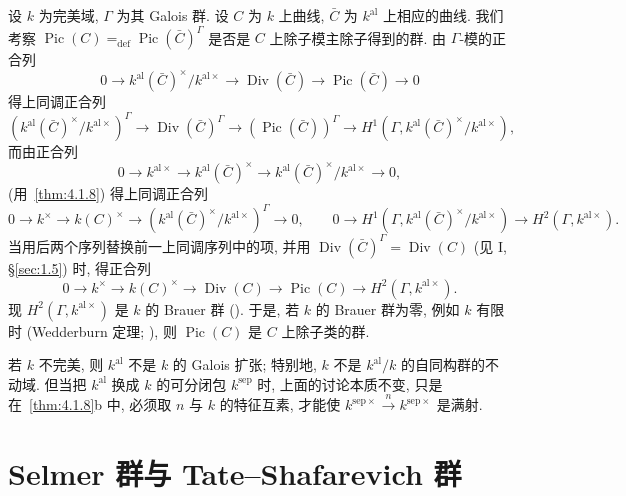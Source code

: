 \begin{example} \label{thm:4.1.10}
设 $k$ 为完美域, $\Gamma$ 为其 Galois 群. 设 $C$ 为 $k$ 上曲线, $\bar{C}$ 为 $k^{\mathrm{al}}$ 上相应的曲线. 我们考察 $\operatorname{Pic}(C) \mathrel{=_{\mathrm{def}}} \operatorname{Pic}(\bar{C})^{\Gamma}$ 是否是 $C$ 上除子模主除子得到的群. 由 $\Gamma$-模的正合列
\[
0\to k^{\mathrm{al}}(\bar{C})^{\times}/k^{\mathrm{al}\times}\to\operatorname{Div}(\bar{C})\to\operatorname{Pic}(\bar{C})\to 0
\]
得上同调正合列
\[
\left(k^{\mathrm{al}}(\bar{C})^{\times}/k^{\mathrm{al}\times}\right)^{\Gamma}\to\operatorname{Div}(\bar{C})^{\Gamma}\to\left(\operatorname{Pic}(\bar{C})\right)^{\Gamma}\to H^1(\Gamma, k^{\mathrm{al}}(\bar{C})^{\times}/k^{\mathrm{al}\times}),
\]
而由正合列
\[
0\to k^{\mathrm{al}\times}\to k^{\mathrm{al}}(\bar{C})^{\times}\to k^{\mathrm{al}}(\bar{C})^{\times}/k^{\mathrm{al}\times}\to 0,
\]
(用~\ref{thm:4.1.8}) 得上同调正合列
\[
0\to k^{\times}\to k(C)^{\times}\to\left(k^{\mathrm{al}}(\bar{C})^{\times}/k^{\mathrm{al}\times}\right)^{\Gamma}\to 0,\qquad
0\to H^1(\Gamma, k^{\mathrm{al}}(\bar{C})^{\times}/k^{\mathrm{al}\times})\to H^2(\Gamma, k^{\mathrm{al}\times}).
\]
当用后两个序列替换前一上同调序列中的项, 并用 $\operatorname{Div}(\bar{C})^{\Gamma} = \operatorname{Div}(C)$ (见 I, \S\ref{sec:1.5}) 时, 得正合列
\[
0\to k^{\times}\to k(C)^{\times}\to\operatorname{Div}(C)\to\operatorname{Pic}(C)\to H^2(\Gamma, k^{\mathrm{al}\times}).
\]
现 $H^2(\Gamma, k^{\mathrm{al}\times})$ 是 $k$ 的 Brauer 群 (\cite[X, \S 5]{serre1979}). 于是, 若 $k$ 的 Brauer 群为零, 例如 $k$ 有限时 (Wedderburn 定理; \cite[X, \S 7]{serre1979}), 则 $\operatorname{Pic}(C)$ 是 $C$ 上除子类的群.
\end{example}

\begin{remark} \label{thm:4.1.11}
若 $k$ 不完美, 则 $k^{\mathrm{al}}$ 不是 $k$ 的 Galois 扩张; 特别地, $k$ 不是 $k^{\mathrm{al}}/k$ 的自同构群的不动域. 但当把 $k^{\mathrm{al}}$ 换成 $k$ 的可分闭包 $k^{\mathrm{sep}}$ 时, 上面的讨论本质不变, 只是在~\ref{thm:4.1.8}b 中, 必须取 $n$ 与 $k$ 的特征互素, 才能使 $k^{\mathrm{sep}\times}\xrightarrow{n}k^{\mathrm{sep}\times}$ 是满射.
\end{remark}

\section{Selmer 群与 Tate--Shafarevich 群}\label{sec:4.2}

